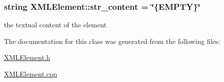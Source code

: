 \subsubsection[{str\+\_\+content}]{\setlength{\rightskip}{0pt plus 5cm}string X\+M\+L\+Element\+::str\+\_\+content = \char`\"{}\{E\+M\+P\+T\+Y\}\char`\"{}\hspace{0.3cm}{\ttfamily [private]}}\label{class_x_m_l_element_a2d4e27f50c33a8faa5f825199e921475}
the textual content of the element 

The documentation for this class was generated from the following files\+:\begin{DoxyCompactItemize}
\item 
\hyperlink{_x_m_l_element_8h}{X\+M\+L\+Element.\+h}\item 
\hyperlink{_x_m_l_element_8cpp}{X\+M\+L\+Element.\+cpp}\end{DoxyCompactItemize}
